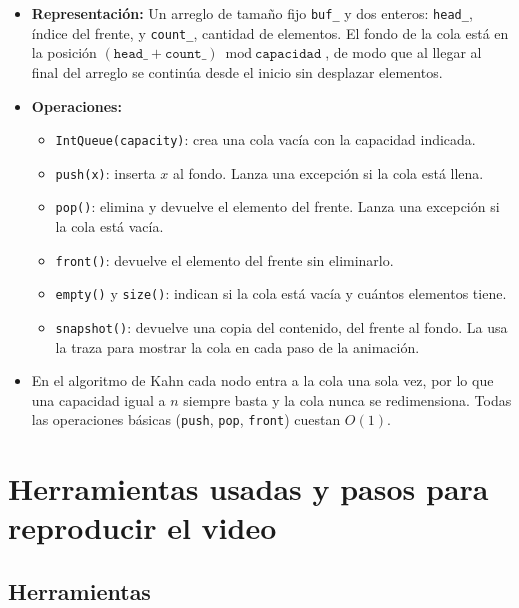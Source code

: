 \documentclass[a4paper, table]{article}
\begin{document}
\begin{itemize}
    Secuencia de enteros con política FIFO: el primer elemento en entrar es el primero en salir.
    \item \textbf{Representación:} Un arreglo de tamaño fijo \texttt{buf\_} y dos enteros: \texttt{head\_}, índice del frente, y \texttt{count\_}, cantidad de elementos. El fondo de la cola está en la posición $(\texttt{head\_} + \texttt{count\_}) \bmod \texttt{capacidad}$, de modo que al llegar al final del arreglo se continúa desde el inicio sin desplazar elementos.
    \item \textbf{Operaciones:}
    \begin{itemize}
      \item \texttt{IntQueue(capacity)}: crea una cola vacía con la capacidad indicada.
      \item \texttt{push(x)}: inserta $x$ al fondo. Lanza una excepción si la cola está llena.
      \item \texttt{pop()}: elimina y devuelve el elemento del frente. Lanza una excepción si la cola está vacía.
      \item \texttt{front()}: devuelve el elemento del frente sin eliminarlo.
      \item \texttt{empty()} y \texttt{size()}: indican si la cola está vacía y cuántos elementos tiene.
      \item \texttt{snapshot()}: devuelve una copia del contenido, del frente al fondo. La usa la traza para mostrar la cola en cada paso de la animación.
    \end{itemize}
    \item En el algoritmo de Kahn cada nodo entra a la cola una sola vez, por lo que una capacidad igual a $n$ siempre basta y la cola nunca se redimensiona. Todas las operaciones básicas (\texttt{push}, \texttt{pop}, \texttt{front}) cuestan $O(1)$.
\end{itemize}

\section{Herramientas usadas y pasos para reproducir el video}

\subsection{Herramientas}
\end{document}
